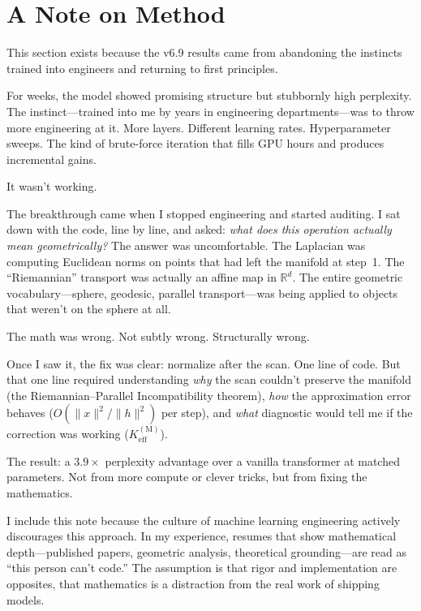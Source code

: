 \documentclass[11pt,a4paper]{article}
\theoremstyle{definition}
\theoremstyle{remark}
\begin{document}
\bigskip

\section*{A Note on Method}
\label{sec:method_note}

This section exists because the v6.9 results came from abandoning 
the instincts trained into engineers and returning to first 
principles.

For weeks, the model showed promising structure but stubbornly high 
perplexity. The instinct---trained into me by years in engineering 
departments---was to throw more engineering at it. More layers. 
Different learning rates. Hyperparameter sweeps. The kind of 
brute-force iteration that fills GPU hours and produces incremental 
gains.

It wasn't working.

The breakthrough came when I stopped engineering and started auditing. 
I sat down with the code, line by line, and asked: \emph{what does 
this operation actually mean geometrically?} The answer was 
uncomfortable. The Laplacian was computing Euclidean norms on points 
that had left the manifold at step~1. The ``Riemannian'' transport 
was actually an affine map in $\mathbb{R}^d$. The entire geometric 
vocabulary---sphere, geodesic, parallel transport---was being applied 
to objects that weren't on the sphere at all.

The math was wrong. Not subtly wrong. Structurally wrong.

Once I saw it, the fix was clear: normalize after the scan. One line 
of code. But that one line required understanding \emph{why} the 
scan couldn't preserve the manifold (the Riemannian--Parallel 
Incompatibility theorem\label{rem:rpi}), \emph{how} the approximation error behaves 
($O(\|x\|^2/\|h\|^2)$ per step), and \emph{what} diagnostic would 
tell me if the correction was working ($K_{\mathrm{eff}}^{(\mathrm{M})}$).

The result: a $3.9\times$ perplexity advantage over a vanilla 
transformer at matched parameters. Not from more compute or clever 
tricks, but from fixing the mathematics.

\medskip

I include this note because the culture of machine learning engineering 
actively discourages this approach. In my experience, resumes that 
show mathematical depth---published papers, geometric analysis, 
theoretical grounding---are read as ``this person can't code.'' The 
assumption is that rigor and implementation are opposites, that 
mathematics is a distraction from the real work of shipping models.
\end{document}

